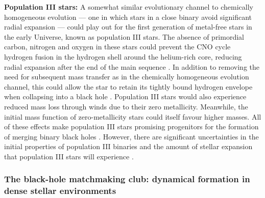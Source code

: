 \documentclass[review]{elsarticle}
\begin{document}
\textbf{Population III stars:} A somewhat similar evolutionary channel to chemically homogeneous evolution --- one in which stars in a close binary avoid significant radial expansion --- could play out for the first generation of metal-free stars in the early Universe, known as population III stars.  The absence of primordial carbon, nitrogen and oxygen in these stars could prevent the CNO cycle hydrogen fusion in the hydrogen shell around the helium-rich core, reducing radial expansion after the end of the main sequence \citep{Marigo:2001}.  In addition to removing the need for subsequent mass transfer as in the chemically homogeneous evolution channel, this could allow the star to retain its tightly bound hydrogen envelope when collapsing into a black hole \citep{Kinugawa:2021}.  Population III stars would also experience reduced mass loss through winds due to their zero metallicity.   Meanwhile, the initial mass function of zero-metallicity stars could itself favour higher masses.  All of these effects make population III stars promising progenitors for the formation of merging binary black holes \citep{Belczynski:2004popIII,Kinugawa:2014,Inayoshi:2017}.  However, there are significant uncertainties in the initial properties of population III binaries and the amount of stellar expansion that population III stars will experience \citep{Hirano:2014,Stacy:2016,Hartwig:2016,Belczynski:2017popIII}.



\subsubsection{The black-hole matchmaking club: dynamical formation in dense stellar environments}\label{form:dyn}
\end{document}
